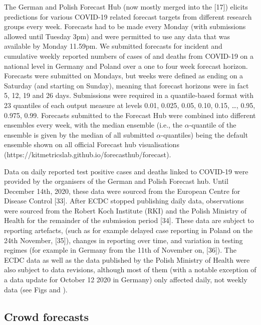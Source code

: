 \documentclass[10pt,letterpaper]{article}
\begin{document}
The German and Polish Forecast Hub (now mostly merged into the {[}17{]})
elicits predictions for various COVID-19 related forecast targets from
different research groups every week. Forecasts had to be made every
Monday (with submissions allowed until Tuesday 3pm) and were permitted
to use any data that was available by Monday 11.59pm. We submitted
forecasts for incident and cumulative weekly reported numbers of cases
of and deaths from COVID-19 on a national level in Germany and Poland
over a one to four week forecast horizon. Forecasts were submitted on
Mondays, but weeks were defined as ending on a Saturday (and starting on
Sunday), meaning that forecast horizons were in fact 5, 12, 19 and 26
days. Submissions were required in a quantile-based format with 23
quantiles of each output measure at levels 0.01, 0.025, 0.05, 0.10,
0.15, \ldots, 0.95, 0.975, 0.99. Forecasts submitted to the Forecast Hub
were combined into different ensembles every week, with the median
ensemble (i.e., the \(\alpha\)-quantile of the ensemble is given by the
median of all submitted \(\alpha\)-quantiles) being the default ensemble
shown on all official Forecast hub visualisations
(https://kitmetricslab.github.io/forecasthub/forecast).

Data on daily reported test positive cases and deaths linked to COVID-19
were provided by the organisers of the German and Polish Forecast hub.
Until December 14th, 2020, these data were sourced from the European
Centre for Disease Control {[}33{]}. After ECDC stopped publishing daily
data, observations were sourced from the Robert Koch Institute (RKI) and
the Polish Ministry of Health for the remainder of the submission period
{[}34{]}. These data are subject to reporting artefacts, (such as for
example delayed case reporting in Poland on the 24th November,
{[}35{]}), changes in reporting over time, and variation in testing
regimes (for example in Germany from the 11th of November on, {[}36{]}).
The ECDC data as well as the data published by the Polish Ministry of
Health were also subject to data revisions, although most of them (with
a notable exception of a data update for October 12 2020 in Germany)
only affected daily, not weekly data (see Figs
 and ).

\hypertarget{crowd-forecasts}{%
\subsection{Crowd forecasts}\label{crowd-forecasts}}
\end{document}
